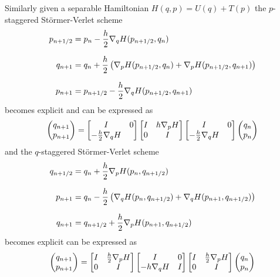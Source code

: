 \documentclass[twoside,a4paper]{article}
\begin{document}
Similarly given a separable Hamiltonian $H(q,p) = U(q) + T(p)$ the $p$-staggered Störmer-Verlet scheme
\begin{align*}
	p_{n+1/2} &= p_n - \frac{h}{2} \grad[q]{H}(p_{n+1/2}, q_n) \\[7pt]
	q_{n+1} &= q_n + \frac{h}{2} \lb \grad[p]{H}(p_{n+1/2}, q_n) + \grad[p]{H}(p_{n+1/2}, q_{n+1}) \rb \\[7pt]
	p_{n+1} &= p_{n+1/2} - \frac{h}{2} \grad[q]{H}(p_{n+1/2}, q_{n+1})
\end{align*}
becomes explicit and can be expressed as
\begin{equation*}
	\begin{pmatrix}
		q_{n+1} \\
		p_{n+1}
	\end{pmatrix} =
	\begin{bmatrix}
		I & 0 \\
		-\frac{h}{2} \grad[q]{H}
	\end{bmatrix}
	\begin{bmatrix}
		I & h \grad[p]{H} \\
		0 & I
	\end{bmatrix}
	\begin{bmatrix}
		I & 0 \\
		-\frac{h}{2} \grad[q]{H}
	\end{bmatrix}
	\begin{pmatrix}
		q_{n} \\
		p_{n}
	\end{pmatrix}
\end{equation*}
and the $q$-staggered Störmer-Verlet scheme
\begin{align*}
	q_{n+1/2} &= q_n + \frac{h}{2} \grad[p]{H}(p_n, q_{n+1/2}) \\[7pt]
	p_{n+1} &= q_n - \frac{h}{2} \lb \grad[q]{H}(p_n, q_{n+1/2}) + \grad[q]{H}(p_{n+1}, q_{n+1/2}) \rb \\[7pt]
	q_{n+1} &= q_{n+1/2} + \frac{h}{2} \grad[p]{H}(p_{n+1}, q_{n+1/2})
\end{align*}
becomes explicit can be expressed as
\begin{equation*}
	\begin{pmatrix}
		q_{n+1} \\
		p_{n+1}
	\end{pmatrix} =
	\begin{bmatrix}
		I & \frac{h}{2} \grad[p]{H} \\
		0 & I
	\end{bmatrix}
	\begin{bmatrix}
		I & 0 \\
		-h \grad[q]{H} & I
	\end{bmatrix}
	\begin{bmatrix}
		I & \frac{h}{2} \grad[p]{H} \\
		0 & I
	\end{bmatrix}
	\begin{pmatrix}
		q_{n} \\
		p_{n}
	\end{pmatrix}
\end{equation*}
\end{document}
